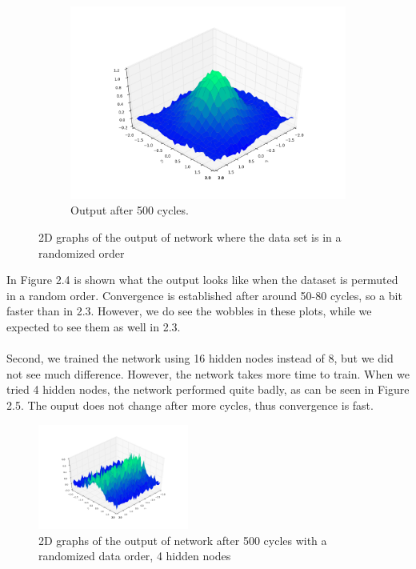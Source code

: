 \documentclass[a4paper,10pt]{article}
\numberwithin{equation}{section} %
\numberwithin{figure}{section} %
\numberwithin{table}{section} %
\theoremstyle{mytheor}
\begin{document}
\begin{enumerate}
\begin{figure}[h!]
\begin{subfigure}[b]{0.45\textwidth}
				\includegraphics[width=\textwidth]{ex2_4_500.png}\vspace{-0.5cm}
				\caption{Output after 500 cycles.}
			\end{subfigure}
   			\caption{\vspace{-0.1cm} 2D graphs of the output of network where the data set is in a randomized order}\vspace{-0.2cm}
  		\end{figure}
		\noindent In Figure 2.4 is shown what the output looks like when the dataset is permuted in a random order. Convergence is established after around 50-80 cycles, so a bit faster than in 2.3. However, we do see the wobbles in these plots, while we expected to see them as well in 2.3.\\\\
		Second, we trained the network using 16 hidden nodes instead of 8, but we did not see much difference. However,  the network takes more time to train. When we tried 4 hidden nodes, the network performed quite badly, as can be seen in Figure 2.5. The ouput does not change after more cycles, thus convergence is fast.
		\begin{figure}[h!]
   			\centering
   			\includegraphics[width=0.44\textwidth]{ex2_4lh_500.png}\vspace{-0.6cm}
   			\caption{\vspace{-0.1cm} 2D graphs of the output of network after 500 cycles with a randomized data order, 4 hidden nodes}\vspace{-0.2cm}
  		\end{figure}
		

\end{enumerate}
\end{document}
